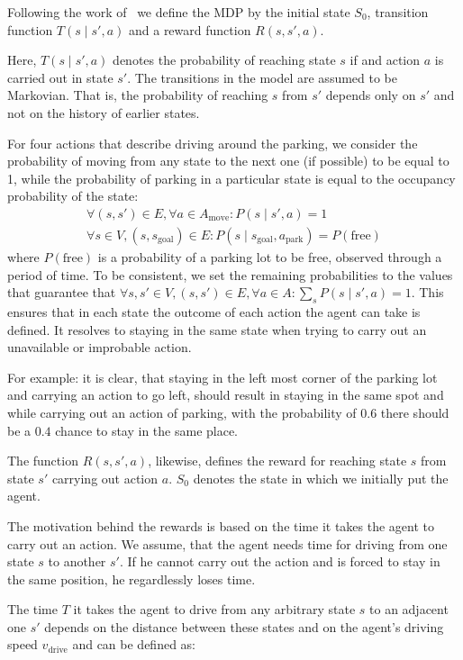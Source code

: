 Following the work of~\citet{bellman1957} we define the MDP by the initial
state $S_0$, transition function $T(s \mid s', a)$ and a reward function $R(s,
s', a)$.

Here, $T(s \mid s', a)$ denotes the probability of reaching state
$s$ if and action $a$ is carried out in state $s'$. The transitions in the
model are assumed to be Markovian. That is, the probability of reaching $s$
from $s'$ depends only on $s'$ and not on the history of earlier states.

For four actions that describe driving around the parking, we consider the
probability of moving from any state to the next one (if possible) to be equal
to 1, while the probability of parking in a particular state is equal to the
occupancy probability of the state:
\begin{eqnarray}
\forall (s, s') \in E, \forall a \in A_{\mathrm{move}} : P(s \mid s', a) = 1 \\
\forall s \in V, (s,s_{\mathrm{goal}}) \in E : P(s \mid s_{\mathrm{goal}}, a_{\mathrm{park}}) = P(\mathrm{free})
\end{eqnarray}
where $P(\mathrm{free})$ is a probability of a parking lot to be free, observed
through a period of time. To be consistent, we set the remaining probabilities
to the values that guarantee that $\forall s, s' \in V, (s, s') \in E, \forall
a \in A: \sum_{s}P(s \mid s', a) = 1$. This ensures that in each state the
outcome of each action the agent can take is defined. It resolves to staying
in the same state when trying to carry out an unavailable or improbable action.

For example: it is clear, that staying in the left most corner of the parking
lot and carrying an action to go left, should result in staying in the same
spot and while carrying out an action of parking, with the probability of
$0.6$ there should be a $0.4$ chance to stay in the same place.

The function $R(s, s', a)$, likewise, defines the reward for reaching state $s$
from state $s'$ carrying out action $a$. $S_0$ denotes the state in which we
initially put the agent.

The motivation behind the rewards is based on the time it takes the agent to
carry out an action. We assume, that the agent needs time for driving from one
state $s$ to another $s'$. If he cannot carry out the action and is forced to
stay in the same position, he regardlessly loses time.

The time $T$ it takes the agent to drive from any arbitrary state $s$ to an
adjacent one $s'$ depends on the distance between these states and on the
agent's driving speed $v_{\mathrm{drive}}$ and can be defined as:

